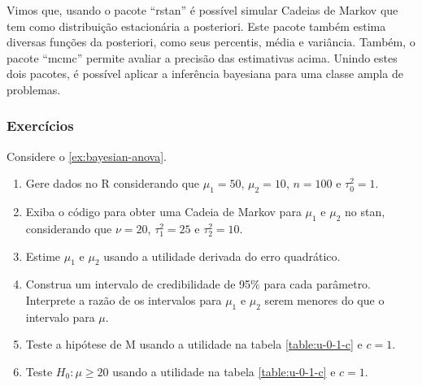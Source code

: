 \begin{example}

\end{example}

\begin{example}

\end{example}

\begin{example}

\end{example}

\begin{example}[ANOVA]

\end{example}


Vimos que, usando o pacote ``rstan''
é possível simular Cadeias de Markov que tem
como distribuição estacionária a posteriori.
Este pacote também estima diversas funções da posteriori,
como seus percentis, média e variância.
Também, o pacote ``mcmc'' permite avaliar a
precisão das estimativas acima.
Unindo estes dois pacotes, é possível aplicar a
inferência bayesiana para uma classe ampla de problemas.




\subsubsection{Exercícios}

\begin{exercise}
 \label{ex:anova-stan}
 Considere o \cref{ex:bayesian-anova}.
 \begin{enumerate}[label=(\alph*)]
  \item Gere dados no R considerando que $\mu_{1}=50$, $\mu_{2}=10$, $n=100$ e $\tau_{0}^{2}=1$.
	\item Exiba o código para obter uma Cadeia de Markov para $\mu_{1}$ e $\mu_{2}$ no stan,
	      considerando que $\nu = 20$, $\tau_{1}^{2}=25$ e $\tau_{2}^{2}=10$.
	\item Estime $\mu_{1}$ e $\mu_{2}$ usando a utilidade derivada do erro quadrático.
	\item Construa um intervalo de credibilidade de 95\% para cada parâmetro.
	      Interprete a razão de os intervalos para $\mu_{1}$ e $\mu_{2}$ serem menores 
				do que o intervalo para $\mu$.
	\item Teste a hipótese de M usando a utilidade na tabela \ref{table:u-0-1-c} e $c=1$.
	\item Teste $H_{0}: \mu \geq 20$ usando a utilidade na tabela \ref{table:u-0-1-c} e $c=1$.
 \end{enumerate}
\end{exercise}

